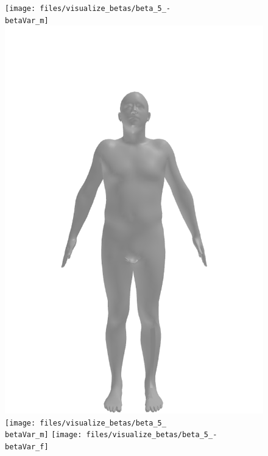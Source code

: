 \begin{figure}[ht!]
    \centering

    \begin{minipage}[b]{\textwidth}
        \centering
        \texttt{[image: files/visualize\_betas/beta\_5\_-\\betaVar\_m]}
        \includegraphics[width=\imgWidth]{files/visualize_betas/baseline_m}
        \texttt{[image: files/visualize\_betas/beta\_5\_\\betaVar\_m]}
        \linebreak
        \texttt{[image: files/visualize\_betas/beta\_5\_-\\betaVar\_f]}

\end{minipage}
\end{figure}
